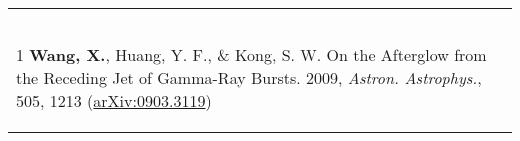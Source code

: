\documentclass[letterpaper,11pt]{article}
\newcommand{\narrow}{-1.8ex}
\begin{document}
\begin{longtable}{p{6.5in}}
\begin{list}{}{\leftmargin=1em}
$$    \item[1]\hypertarget{09.wang.aa}{} \textbf{Wang, X.}, Huang, Y. F., \& Kong, S. W. On the Afterglow from the Receding Jet of Gamma-Ray Bursts. 2009, \textit{Astron. Astrophys.}, 505, 1213 (\href{http://arxiv.org/abs/0903.3119}{arXiv:0903.3119})
\end{list}  \\[\narrow]


\end{longtable}
\end{document}
